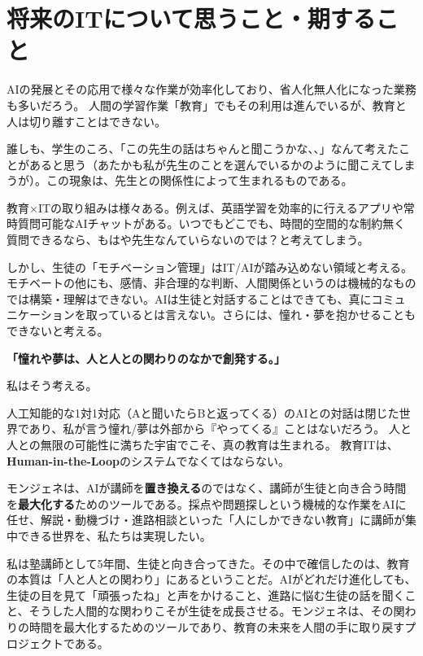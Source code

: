 \documentclass[paper=a4,fontsize=10.5bp,jafontsize=10.5bp,twocolumn]{jlreq}
\begin{document}
\section{将来のITについて思うこと・期すること}

AIの発展とその応用で様々な作業が効率化しており、省人化無人化になった業務も多いだろう。
人間の学習作業「教育」でもその利用は進んでいるが、教育と人は切り離すことはできない。

誰しも、学生のころ、「この先生の話はちゃんと聞こうかな、、」なんて考えたことがあると思う（あたかも私が先生のことを選んでいるかのように聞こえてしまうが）。この現象は、先生との関係性によって生まれるものである。

教育×ITの取り組みは様々ある。例えば、英語学習を効率的に行えるアプリや常時質問可能なAIチャットがある。いつでもどこでも、時間的空間的な制約無く質問できるなら、もはや先生なんていらないのでは？と考えてしまう。

しかし、生徒の「モチベーション管理」はIT/AIが踏み込めない領域と考える。モチベートの他にも、感情、非合理的な判断、人間関係というのは機械的なものでは構築・理解はできない。AIは生徒と対話することはできても、真にコミュニケーションを取っているとは言えない。さらには、憧れ・夢を抱かせることもできないと考える。

\begin{highlightbox}
\textbf{「憧れや夢は、人と人との関わりのなかで創発する。」}

私はそう考える。

人工知能的な1対1対応（Aと聞いたらBと返ってくる）のAIとの対話は閉じた世界であり、私が言う憧れ/夢は外部から『やってくる』ことはないだろう。
人と人との無限の可能性に満ちた宇宙でこそ、真の教育は生まれる。
教育ITは、\textbf{Human-in-the-Loop}のシステムでなくてはならない。
\end{highlightbox}

モンジェネは、AIが講師を\textbf{置き換える}のではなく、講師が生徒と向き合う時間を\textbf{最大化する}ためのツールである。採点や問題探しという機械的な作業をAIに任せ、解説・動機づけ・進路相談といった「人にしかできない教育」に講師が集中できる世界を、私たちは実現したい。

私は塾講師として5年間、生徒と向き合ってきた。その中で確信したのは、教育の本質は「人と人との関わり」にあるということだ。AIがどれだけ進化しても、生徒の目を見て「頑張ったね」と声をかけること、進路に悩む生徒の話を聞くこと、そうした人間的な関わりこそが生徒を成長させる。モンジェネは、その関わりの時間を最大化するためのツールであり、教育の未来を人間の手に取り戻すプロジェクトである。
\end{document}
